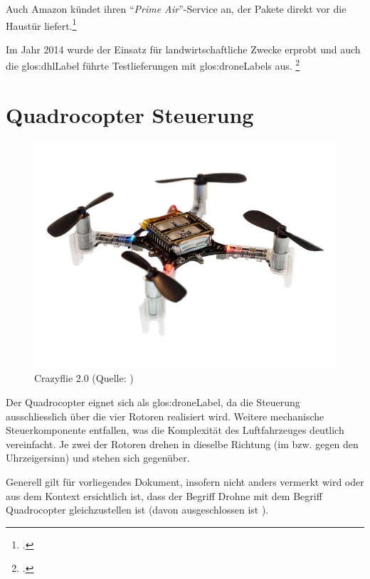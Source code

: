 Auch Amazon kündet ihren "`\textit{Prime Air}"'-Service an, der Pakete direkt vor die Haustür liefert.\footcite{Amazon_Prime_Air_2015-08-28}

Im Jahr 2014 wurde der Einsatz für landwirtschaftliche Zwecke erprobt und auch die \gls{glos:dhlLabel} führte Testlieferungen mit \glspl{glos:droneLabel} aus. \footcite{Kleine_Geschichte_der_Drohnen_-_Nachrichten_Print_-_WELT_KOMPAKT_-_Lifestyle_-_DIE_WELT_2015-03-21}


\section{Quadrocopter Steuerung}
\begin{figure}
	\vspace{-3\baselineskip}
	\includegraphics[width=1.0\linewidth]{images/analysis/crazyflize.jpg}
	\caption[Crazyflie 2.0]{Crazyflie 2.0 (Quelle: )}
	\vspace{-1.5\baselineskip}
\end{figure}
Der Quadrocopter eignet sich als \gls{glos:droneLabel}, da die Steuerung ausschliesslich über die vier Rotoren realisiert wird.
Weitere mechanische Steuerkomponente entfallen, was die Komplexität des Luftfahrzeuges deutlich vereinfacht.
Je zwei der Rotoren drehen in dieselbe Richtung (im bzw. gegen den Uhrzeigersinn) und stehen sich gegenüber.

Generell gilt für vorliegendes Dokument, insofern nicht anders vermerkt wird oder aus dem Kontext ersichtlich ist, dass der Begriff Drohne mit dem Begriff Quadrocopter gleichzustellen ist (davon ausgeschlossen ist ).


